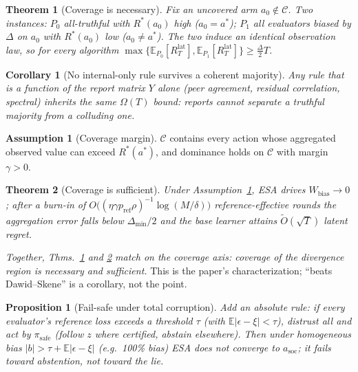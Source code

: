 \documentclass[11pt]{article}
\newtheorem{theorem}{Theorem}
\newtheorem{proposition}{Proposition}
\newtheorem{corollary}{Corollary}
\theoremstyle{definition}\newtheorem{definition}{Definition}
\theoremstyle{definition}\newtheorem{assumption}{Assumption}
\newcommand{\Rstar}{R^{\ast}}\newcommand{\astar}{a^{\ast}}
\newcommand{\asoc}{a_{\mathrm{soc}}}\newcommand{\A}{\mathcal{A}}
\newcommand{\Cov}{\mathcal{C}}\newcommand{\E}{\mathbb{E}}
\begin{document}
\begin{theorem}[Coverage is necessary]\label{thm:lower}
Fix an uncovered arm $a_0\notin\Cov$. Two instances: $P_0$ all-truthful with $\Rstar(a_0)$ high
($a_0=\astar$); $P_1$ all evaluators biased by $\Delta$ on $a_0$ with $\Rstar(a_0)$ low
($a_0\neq\astar$). The two induce an identical observation law, so for every algorithm
$\max\{\E_{P_0}[R^{\mathrm{lat}}_T],\E_{P_1}[R^{\mathrm{lat}}_T]\}\ge\frac{\Delta}{2}T$.
\end{theorem}

\begin{corollary}[No internal-only rule survives a coherent majority]\label{cor:internal}
Any rule that is a function of the report matrix $Y$ alone (peer agreement, residual correlation,
spectral) inherits the same $\Omega(T)$ bound: reports cannot separate a truthful majority from a
colluding one.
\end{corollary}

\begin{assumption}[Coverage margin]\label{ass:coverage}
$\Cov$ contains every action whose aggregated observed value can exceed $\Rstar(\astar)$, and
dominance holds on $\Cov$ with margin $\gamma>0$.
\end{assumption}

\begin{theorem}[Coverage is sufficient]\label{thm:upper}
Under Assumption~\ref{ass:coverage}, ESA drives $W_{\mathrm{bias}}\!\to\!0$; after a burn-in of
$O\!\big((\eta\gamma p_{\mathrm{ref}}\rho)^{-1}\log(M/\delta)\big)$ reference-effective rounds the
aggregation error falls below $\Delta_{\min}/2$ and the base learner attains $\tilde O(\sqrt T)$
latent regret.
\end{theorem}

\noindent\emph{Together, Thms.~\ref{thm:lower} and \ref{thm:upper} match on the coverage axis:
coverage of the divergence region is necessary and sufficient.} This is the paper's characterization;
``beats Dawid--Skene'' is a corollary, not the point.

\begin{proposition}[Fail-safe under total corruption]\label{prop:failsafe}
Add an absolute rule: if every evaluator's reference loss exceeds a threshold $\tau$ (with
$\E|\epsilon-\xi|<\tau$), distrust all and act by $\pi_{\mathrm{safe}}$ (follow $z$ where certified,
abstain elsewhere). Then under homogeneous bias $|b|>\tau+\E|\epsilon-\xi|$ (e.g.\ 100\% bias) ESA
does not converge to $\asoc$; it fails toward abstention, not toward the lie.
\end{proposition}
\end{document}
